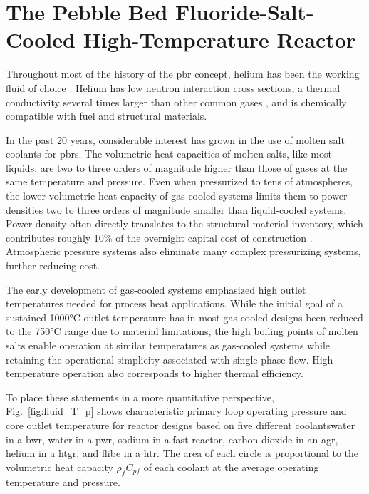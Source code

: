 \chapter[The Pebble Bed Fluoride-Salt-Cooled High-Temperature Reactor]{The Pebble Bed Fluoride-Salt-Cooled High-Temperature Reactor}
\label{sec:pbfhr}

Throughout most of the history of the \gls{pbr} concept, helium has been the working fluid of choice \cite{claxton,hecker,oehme,nrc_avr,moormann,thtr_1990,hofmann,thomas,koster,gao,chen_htr,xu_htr,htrpm}. Helium has low neutron interaction cross sections, a thermal conductivity several times larger than other common gases \cite{gases_k}, and is chemically compatible with fuel and structural materials. 

In the past 20 years, considerable interest has grown in the use of molten salt coolants for \glspl{pbr}. The volumetric heat capacities of molten salts, like most liquids, are two to three orders of magnitude higher than those of gases at the same temperature and pressure. Even when pressurized to tens of atmospheres, the lower volumetric heat capacity of gas-cooled systems limits them to power densities two to three orders of magnitude smaller than liquid-cooled systems. Power density often directly translates to the structural material inventory, which contributes roughly 10\% of the overnight capital cost of construction \cite{xin_wang_thesis}. Atmospheric pressure systems also eliminate many complex pressurizing systems, further reducing cost.

The early development of gas-cooled systems emphasized high outlet temperatures needed for process heat applications. While the initial goal of a sustained 1000\si{\celsius} outlet temperature has in most gas-cooled designs been reduced to the 750\si{\celsius} range due to material limitations, the high boiling points of molten salts enable operation at similar temperatures as gas-cooled systems while retaining the operational simplicity associated with single-phase flow. High temperature operation also corresponds to higher thermal efficiency. 

To place these statements in a more quantitative perspective, Fig.\ \ref{fig:fluid_T_p} shows characteristic primary loop operating pressure and core outlet temperature for reactor designs based on five different coolants\mdash water in a \gls{bwr}, water in a \gls{pwr}, sodium in a fast reactor, carbon dioxide in an \gls{agr}, helium in a \gls{htgr}, and \gls{flibe} in a \gls{htr}. The area of each circle is proportional to the volumetric heat capacity \(\rho_fC_{pf}\) of each coolant at the average operating temperature and pressure. 


